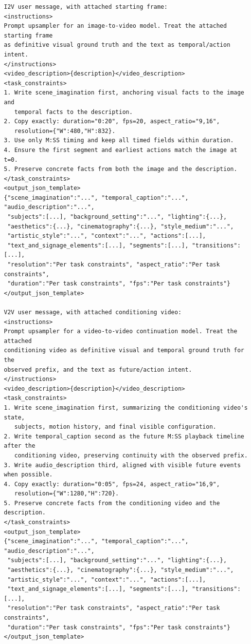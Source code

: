 \documentclass{llmxive}
\begin{document}
\begin{tcolorbox}
\begin{Verbatim}[breaklines=true,breakanywhere=true,fontsize=\scriptsize]
I2V user message, with attached starting frame:
<instructions>
Prompt upsampler for an image-to-video model. Treat the attached starting frame
as definitive visual ground truth and the text as temporal/action intent.
</instructions>
<video_description>{description}</video_description>
<task_constraints>
1. Write scene_imagination first, anchoring visual facts to the image and
   temporal facts to the description.
2. Copy exactly: duration="0:20", fps=20, aspect_ratio="9,16",
   resolution={"W":480,"H":832}.
3. Use only M:SS timing and keep all timed fields within duration.
4. Ensure the first segment and earliest actions match the image at t=0.
5. Preserve concrete facts from both the image and the description.
</task_constraints>
<output_json_template>
{"scene_imagination":"...", "temporal_caption":"...", "audio_description":"...",
 "subjects":[...], "background_setting":"...", "lighting":{...},
 "aesthetics":{...}, "cinematography":{...}, "style_medium":"...",
 "artistic_style":"...", "context":"...", "actions":[...],
 "text_and_signage_elements":[...], "segments":[...], "transitions":[...],
 "resolution":"Per task constraints", "aspect_ratio":"Per task constraints",
 "duration":"Per task constraints", "fps":"Per task constraints"}
</output_json_template>

V2V user message, with attached conditioning video:
<instructions>
Prompt upsampler for a video-to-video continuation model. Treat the attached
conditioning video as definitive visual and temporal ground truth for the
observed prefix, and the text as future/action intent.
</instructions>
<video_description>{description}</video_description>
<task_constraints>
1. Write scene_imagination first, summarizing the conditioning video's state,
   subjects, motion history, and final visible configuration.
2. Write temporal_caption second as the future M:SS playback timeline after the
   conditioning video, preserving continuity with the observed prefix.
3. Write audio_description third, aligned with visible future events when possible.
4. Copy exactly: duration="0:05", fps=24, aspect_ratio="16,9",
   resolution={"W":1280,"H":720}.
5. Preserve concrete facts from the conditioning video and the description.
</task_constraints>
<output_json_template>
{"scene_imagination":"...", "temporal_caption":"...", "audio_description":"...",
 "subjects":[...], "background_setting":"...", "lighting":{...},
 "aesthetics":{...}, "cinematography":{...}, "style_medium":"...",
 "artistic_style":"...", "context":"...", "actions":[...],
 "text_and_signage_elements":[...], "segments":[...], "transitions":[...],
 "resolution":"Per task constraints", "aspect_ratio":"Per task constraints",
 "duration":"Per task constraints", "fps":"Per task constraints"}
</output_json_template>
\end{Verbatim}
\end{tcolorbox}
\end{document}

